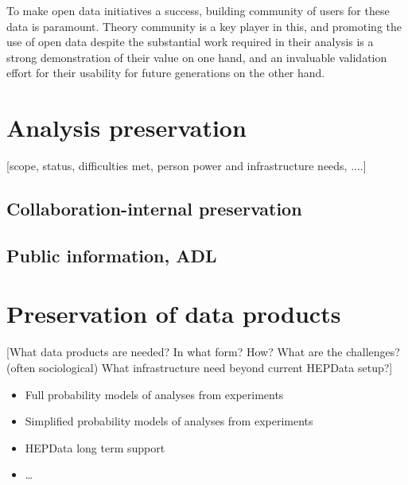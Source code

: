 \documentclass[11pt]{article}
\begin{document}

To make open data initiatives a success, building community of users for these data is paramount. Theory community is a key player in this, and promoting the use of open data despite the substantial work required in their analysis is a strong demonstration of their value on one hand, and an invaluable validation effort for their usability for future generations on the other hand.

\section{Analysis preservation}

[scope, status, difficulties met, person power and infrastructure needs, ....]

\subsection{Collaboration-internal preservation}

\subsection{Public information, ADL}

\section{Preservation of data products}

[What data products are needed? In what form? How? 
What are the challenges? (often sociological) What infrastructure need beyond current HEPData setup?]

\begin{itemize}
    \item Full probability models of analyses from experiments
    \item Simplified probability models of analyses from experiments
    \item HEPData long term support
    \item \ldots
\end{itemize}
\end{document}
